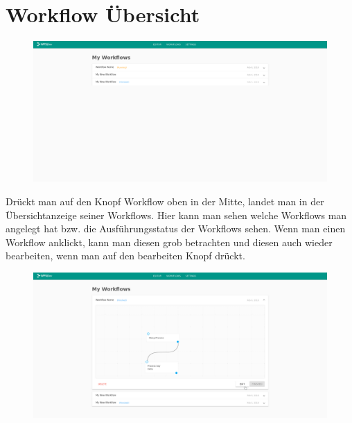 \chapter{Workflow Übersicht}
    \begin{figure}[H]
        \centering
        \includegraphics[width=15.5cm]{images/Workflow Overview.png}
        \label{workflow_overview}
    \end{figure}
    Drückt man auf den Knopf Workflow oben in der Mitte, landet man in der Übersichtanzeige seiner Workflows. Hier kann man sehen welche Workflows man angelegt hat bzw. die Ausführungsstatus der Workflows sehen. Wenn man einen Workflow anklickt, kann man diesen grob betrachten und diesen auch wieder bearbeiten, wenn man auf den bearbeiten Knopf drückt. 
    \begin{figure}[H]
        \centering
        \includegraphics[width=15.5cm]{images/Choose Workflow.png}
        \label{choose_workflow}
    \end{figure}
    
